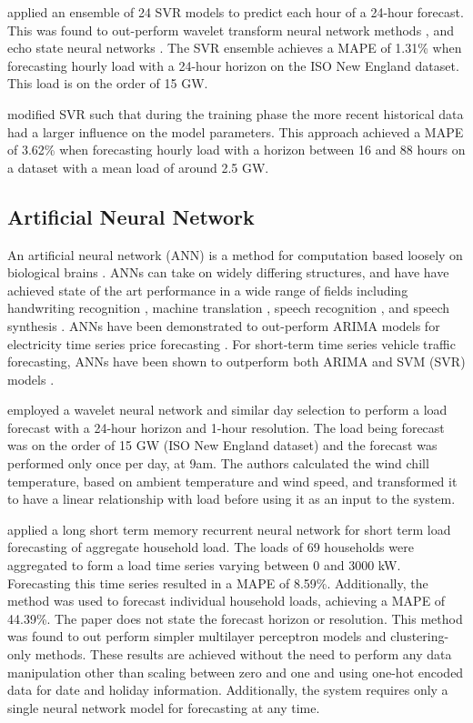 \citet{Ceperic2013} applied an ensemble of 24 SVR models to predict each hour of a 24-hour forecast.
This was found to out-perform wavelet transform neural network methods \cite{RochaReis2005}\cite{AMJADY2009}, and echo state neural networks \cite{Deihimi2012}.
The SVR ensemble achieves a MAPE of 1.31\% when forecasting hourly load with a 24-hour horizon on the ISO New England dataset.
This load is on the order of 15 GW.

\citet{Elattar2010} modified SVR such that during the training phase the more recent historical data had a larger influence on the model parameters.
This approach achieved a MAPE of 3.62\% when forecasting hourly load with a horizon between 16 and 88 hours on a dataset with a mean load of around 2.5 GW.


\subsection{Artificial Neural Network}
An artificial neural network (ANN) is a method for computation based loosely on biological brains \citep{negnevitsky2005artificial}.
ANNs can take on widely differing structures, and have have achieved state of the art performance in a wide range of fields including handwriting recognition \citep{2017arXiv171009829S}, machine translation \citep{Vaswani2017}, speech recognition \citep{Chiu2017}, and speech synthesis \citep{DBLP:journals/corr/OordDZSVGKSK16}.
ANNs have been demonstrated to out-perform ARIMA models for electricity time series price forecasting \citep{Mandal2010}.
For short-term time series vehicle traffic forecasting, ANNs have been shown to outperform both ARIMA and SVM (SVR) models \cite{Zhao2017}.

\citet{Chen2010} employed a wavelet neural network and similar day selection to perform a load forecast with a 24-hour horizon and 1-hour resolution.
The load being forecast was on the order of 15 GW (ISO New England dataset) and the forecast was performed only once per day, at 9am.
The authors calculated the wind chill temperature, based on ambient temperature and wind speed, and transformed it to have a linear relationship with load before using it as an input to the system.

\citet{Kong2017}\cite{Kong2018} applied a long short term memory recurrent neural network for short term load forecasting of aggregate household load.
The loads of 69 households were aggregated to form a load time series varying between 0 and 3000 kW.
Forecasting this time series resulted in a MAPE of 8.59\%.
Additionally, the method was used to forecast individual household loads, achieving a MAPE of 44.39\%.
The paper does not state the forecast horizon or resolution.
This method was found to out perform simpler multilayer perceptron models and clustering-only methods.
These results are achieved without the need to perform any data manipulation other than scaling between zero and one and using one-hot encoded data for date and holiday information.
Additionally, the system requires only a single neural network model for forecasting at any time.

